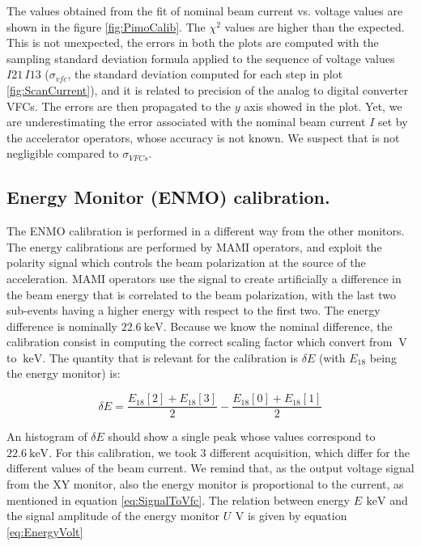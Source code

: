 The values obtained from the fit of nominal beam current vs. voltage values are shown in the figure \ref{fig:PimoCalib}. The $\chi^{2}$ values are higher than the expected. This is not unexpected, the errors in both the plots are computed with the sampling standard deviation formula applied to the sequence of voltage values $I21 \, I13$ ($\sigma_{vfc}$, the standard deviation computed for each step in plot \ref{fig:ScanCurrent}), and it is related to precision of the analog to digital converter VFCs. The errors are then propagated to the $y$ axis showed in the plot. 
Yet, we are underestimating the error associated with the nominal beam current $I$ set by the accelerator operators, whose  accuracy is not known. We suspect that is not negligible compared to $\sigma_{VFCs}$.

\subsection{Energy Monitor (ENMO) calibration.} 

The ENMO calibration is performed in a different way from the other monitors. The energy calibrations are performed by MAMI operators, and exploit the polarity signal which controls the beam polarization at the source of the acceleration. MAMI operators use the signal to create artificially a difference in the beam energy that is correlated to the beam polarization, with the last two sub-events having a higher energy with respect to the first two. The energy difference is nominally $\SI{22.6}{\kilo \electronvolt}$. Because we know the nominal difference, the calibration consist in computing the correct scaling factor which convert from $\SI{}{\volt}$ to $\SI{}{\kilo \electronvolt}$. The quantity that is relevant for the calibration is $\delta E$ (with $E_{18}$ being the energy monitor) is:

\begin{equation*}
\delta E = \frac{E_{18}[2] + E_{18}[3]}{2} - \frac{E_{18}[0] + E_{18}[1]}{2} 
\end{equation*}

An histogram of $\delta E$ should show a single peak whose values correspond to $\SI{22.6}{\kilo \electronvolt}$.
For this calibration, we took 3 different acquisition, which differ for the different values of the beam current. We remind that, as the output voltage signal from the XY monitor, also the energy monitor is proportional to the current, as mentioned in equation \ref{eq:SignalToVfc}. The relation between energy $E \, \SI{}{\kilo \electronvolt}$ and the signal amplitude of the energy monitor $U \, \SI{}{\volt}$ is given by equation \ref{eq:EnergyVolt}

